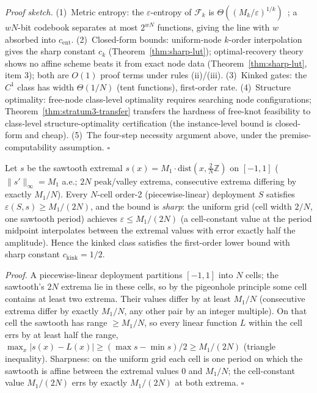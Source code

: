 \vspace{2pt}
\noindent\textit{Proof sketch.}
(1)~Metric entropy: the $\varepsilon$-entropy of $\mathcal{F}_k$ is
$\Theta((M_k/\varepsilon)^{1/k})$~\cite{kolmogorov1959entropy}; a
$wN$-bit codebook separates at most $2^{wN}$ functions, giving the line
with $w$ absorbed into $c_{\mathrm{ent}}$. (2)~Closed-form bounds:
uniform-node $k$-order interpolation gives the sharp constant $c_k$
(Theorem~\ref{thm:sharp-lut}); optimal-recovery theory shows no affine
scheme beats it from exact node data (Theorem~\ref{thm:sharp-lut}, item
3); both are $O(1)$ proof terms under rules (ii)/(iii).
(3)~Kinked gates: the $C^1$ class has width $\Theta(1/N)$ (tent
functions), first-order rate. (4)~Structure optimality: free-node
class-level optimality requires searching node configurations;
Theorem~\ref{thm:stratum3-transfer} transfers the hardness of
free-knot feasibility to class-level structure-optimality
certification (the instance-level bound is closed-form and cheap).
(5)~The four-step necessity argument above, under the
premise-computability assumption. $\square$

\vspace{4pt}
\begin{proposition}
\label{prop:kink-sharp}
Let $s$ be the sawtooth extremal
$s(x) = M_1 \cdot \mathrm{dist}(x, \tfrac{2}{N}\mathbb{Z})$ on $[-1,1]$
($\|s'\|_\infty = M_1$ a.e.; $2N$ peak/valley extrema, consecutive
extrema differing by exactly $M_1/N$). Every $N$-cell order-2
(piecewise-linear) deployment $S$ satisfies
$\varepsilon(S, s) \geq M_1 / (2N)$, and the bound is \emph{sharp}: the
uniform grid (cell width $2/N$, one sawtooth period) achieves
$\varepsilon \leq M_1/(2N)$ (a cell-constant value at the period
midpoint interpolates between the extremal values with error exactly
half the amplitude). Hence the kinked class satisfies the first-order
lower bound with sharp constant $c_{\mathrm{kink}} = 1/2$.
\end{proposition}

\vspace{2pt}
\noindent\textit{Proof.}
A piecewise-linear deployment partitions $[-1,1]$ into $N$ cells; the
sawtooth's $2N$ extrema lie in these cells, so by the pigeonhole
principle some cell contains at least two extrema. Their values differ
by at least $M_1/N$ (consecutive extrema differ by exactly $M_1/N$,
any other pair by an integer multiple). On that cell the sawtooth has
range $\geq M_1/N$, so every linear function $L$ within the cell errs
by at least half the range,
$\max_x |s(x) - L(x)| \geq (\max s - \min s)/2 \geq M_1/(2N)$
(triangle inequality). Sharpness: on the uniform grid each cell is one
period on which the sawtooth is affine between the extremal values
$0$ and $M_1/N$; the cell-constant value $M_1/(2N)$ errs by exactly
$M_1/(2N)$ at both extrema. $\square$

